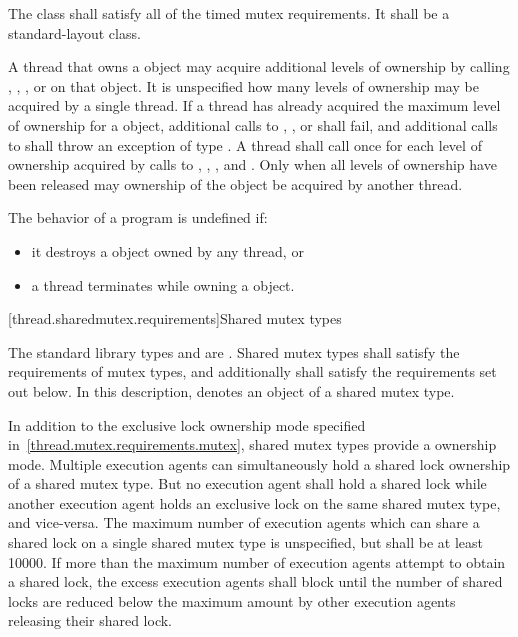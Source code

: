 \pnum
The class  shall satisfy all of the timed mutex
requirements. It shall be a standard-layout
class.

\pnum
A thread that owns a  object may acquire additional
levels of ownership by calling , ,
, or  on that object. It is
unspecified how many levels of ownership may be acquired by a single thread. If
a thread has already acquired the maximum level of ownership for a
 object, additional calls to ,
, or  shall fail, and additional
calls to  shall throw an exception of type . A
thread shall call  once for each level of ownership acquired by
calls to , , , and
. Only when all levels of ownership have been released
may ownership of the object be acquired by another thread.

\pnum
The behavior of a program is undefined if:

\begin{itemize}
\item it destroys a  object owned by any thread, or
\item a thread terminates while owning a  object.
\end{itemize}


[thread.sharedmutex.requirements]{Shared mutex types}

\pnum
The standard library types  and 
are . Shared mutex types shall satisfy the requirements of
mutex types, and additionally
shall satisfy the requirements set out below. In this description,
 denotes an object of a shared mutex type.

\pnum
In addition to the exclusive lock ownership mode specified
in~\ref{thread.mutex.requirements.mutex}, shared mutex types provide a
 ownership mode. Multiple execution agents can
simultaneously hold a shared lock ownership of a shared mutex type. But no
execution agent shall hold a shared lock while another execution agent holds an
exclusive lock on the same shared mutex type, and vice-versa. The maximum
number of execution agents which can share a shared lock on a single shared
mutex type is unspecified, but shall be at least 10000. If more than the
maximum number of execution agents attempt to obtain a shared lock, the
excess execution agents shall block until the number of shared locks are
reduced below the maximum amount by other execution agents releasing their
shared lock.


